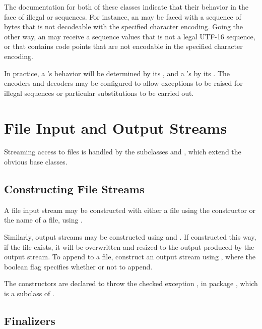 The documentation for both of these classes indicate that their
behavior in the face of illegal  or  sequences.
For instance, an  may be faced with a sequence
of bytes that is not decodeable with the specified character encoding.
Going the other way, an  may receive a
sequence  values that is not a legal UTF-16 sequence, or
that contains code points that are not encodable in the specified
character encoding.  

In practice, a 's behavior will be determined
by its , and a 's by its
.  The encoders and decoders may be configured to
allow exceptions to be raised for illegal sequences or particular
substitutions to be carried out.

\section{File Input and Output Streams}

Streaming access to files is handled by the subclasses
 and , which
extend the obvious base classes.  

\subsection{Constructing File Streams}

A file input stream may be constructed with either a file using the
constructor  or the name of a file, using
.  

Similarly, output streams may be constructed using
 and .
If constructed this way, if the file exists, it will be overwritten
and resized to the output produced by the output stream.  To append
to a file, construct an output stream using
, where the boolean flag
specifies whether or not to append.

The constructors are declared to throw the checked exception
, in package , which is a
subclass of .  

\subsection{Finalizers}

